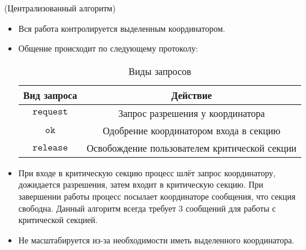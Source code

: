 \begin{algorithm}(Централизованный алгоритм)
    \begin{itemize}
        \item Вся работа контролируется выделенным координатором.
        \item Общение происходит по следующему протоколу:
            \begin{table}[!ht]
                \centering
                \begin{tabular}{|c|c|} \hline
                    Вид запроса & Действие \\ \hline
                    $\texttt{request}$ & Запрос разрешения у координатора \\ \hline
                    $\texttt{ok}$ & Одобрение координатором входа в секцию \\ \hline
                    $\texttt{release}$ & Освобождение пользователем критической 
                    секции \\ \hline
                \end{tabular}
                \caption{Виды запросов}
            \end{table}
        \item При входе в критическую секцию процесс шлёт запрос координатору,
            дожидается разрешения, затем входит в критическую секцию.
            При завершении работы процесс посылает координаторе сообщения,
            что секция свободна. Данный алгоритм всегда требует 3 сообщений для
            работы с критической секцией.
        \item Не масштабируется из-за необходимости иметь выделенного координатора.
    \end{itemize}
\end{algorithm}

